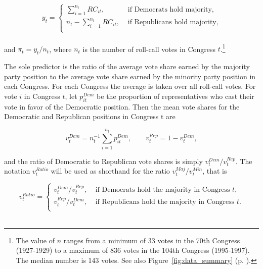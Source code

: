 \begin{equation*}
y_t =
\begin{cases} \sum_{i=1}^{n_t} RC_{it}, & \text{ if Democrats hold majority}, \\[10pt]
n_t - \sum_{i=1}^{n_t} RC_{it}, & \text{ if Republicans hold majority,} \\
\end{cases}
\end{equation*}
~\\[-12pt]
 
\noindent and $\pi_t = y_t / n_t$, where $n_t$ is the number of roll-call votes in 
Congress $t$.\footnote{The value of $n$ ranges from a minimum of 33 votes in the 
70th Congress (1927-1929) to a maximum of 836 votes in the 104th Congress (1995-1997). 
The median number is 143 votes. See also Figure~\ref{fig:data_summary} 
(p. \pageref{fig:data_summary}).} 


The sole predictor is the ratio of the average vote share earned by the majority party position 
to the average vote share earned by the minority party position in each Congress. For each 
Congress the average is taken over all roll-call votes. For vote $i$ in Congress $t$, let 
$p_{it}^{Dem}$ be the proportion of representatives who cast their vote in favor of the Democratic 
position.  Then the mean vote shares for the Democratic and Republican positions in Congress t are

\begin{equation*}
v_t^{Dem} = n_t^{-1} \sum_{i=1}^{n_t} p_{it}^{Dem}, \qquad v_t^{Rep} = 1 - v_t^{Dem},
\end{equation*}

\noindent and the ratio of Democratic to Republican vote shares is simply $v_t^{Dem} / v_t^{Rep}$. 
The notation $v_t^{Ratio}$ will be used as shorthand for the ratio $v_t^{Maj} / v_t^{Min}$, that is 

\begin{equation*}
v_t^{Ratio} = 
\begin{cases} 
v_t^{Dem} / v_t^{Rep}, & \text{ if Democrats hold the majority in Congress $t$,} \\[10pt]
v_t^{Rep} / v_t^{Dem}, & \text{ if Republicans hold the majority in Congress $t$.} \\
\end{cases}
\end{equation*}
~\\[-12pt]


